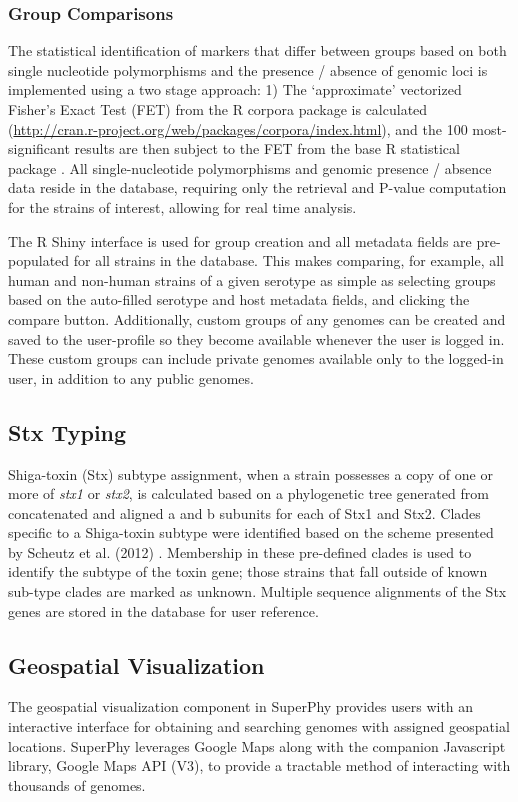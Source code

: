 \documentclass[doublespacing, linenumbers]{bmcart}
\begin{document}
\subsubsection{Group Comparisons}
The statistical identification of markers that differ between groups based on both single nucleotide polymorphisms and the presence / absence of genomic loci is implemented using a two stage approach: 1) The `approximate' vectorized Fisher’s Exact Test (FET) from the R corpora package is calculated (\url{http://cran.r-project.org/web/packages/corpora/index.html}), and the 100 most-significant results are then subject to the FET from the base R statistical package \cite{r_foundation_for_statistical_computing_r:_2005}. All single-nucleotide polymorphisms and genomic presence / absence data reside in the database, requiring only the retrieval and P-value computation for the strains of interest, allowing for real time analysis.

The R Shiny interface is used for group creation and all metadata fields are pre-populated for all strains in the database. This makes comparing, for example, all human and non-human strains of a given serotype as simple as selecting groups based on the auto-filled serotype and host metadata fields, and clicking the compare button. Additionally, custom groups of any genomes can be created and saved to the user-profile so they become available whenever the user is logged in. These custom groups can include private genomes available only to the logged-in user, in addition to any public genomes.

\subsection{Stx Typing}
Shiga-toxin (Stx) subtype assignment, when a strain possesses a copy of one or more of \textit{stx1} or \textit{stx2}, is calculated based on a phylogenetic tree generated from concatenated and aligned a and b subunits for each of Stx1 and Stx2. Clades specific to a Shiga-toxin subtype were identified based on the scheme presented by Scheutz et al. (2012) \cite{scheutz_multicenter_2012}. Membership in these pre-defined clades is used to identify the subtype of the toxin gene; those strains that fall outside of known sub-type clades are marked as unknown. Multiple sequence alignments of the Stx genes are stored in the database for user reference.

\subsection{Geospatial Visualization}
The geospatial visualization component in SuperPhy provides users with an interactive interface for obtaining and searching genomes with assigned geospatial locations. SuperPhy leverages Google Maps along with the companion Javascript library, Google Maps API (V3), to provide a tractable method of interacting with thousands of genomes. 
\end{document}
